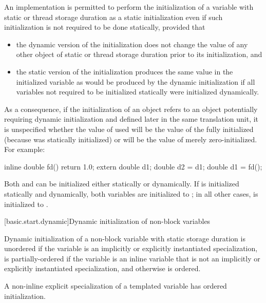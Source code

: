 \pnum
An implementation is permitted to perform the initialization of a
variable with static or thread storage duration as a static
initialization even if such initialization is not required to be done
statically, provided that
\begin{itemize}
\item
the dynamic version of the initialization does not change the
value of any other object of static or thread storage duration
prior to its initialization, and

\item
the static version of the initialization produces the same value
in the initialized variable as would be produced by the dynamic
initialization if all variables not required to be initialized statically
were initialized dynamically.
\end{itemize}
\begin{note}
As a consequence, if the initialization of an object  refers to an
object  potentially requiring dynamic initialization and defined
later in the same translation unit, it is unspecified whether the value of  used
will be the value of the fully initialized  (because  was statically
initialized) or will be the value of  merely zero-initialized. For example:
\begin{codeblock}
inline double fd() { return 1.0; }
extern double d1;
double d2 = d1;
double d1 = fd();
\end{codeblock}
Both  and  can be initialized
either statically or dynamically.
If  is initialized statically and  dynamically,
both variables are initialized to ;
in all other cases,  is initialized to .
\end{note}

[basic.start.dynamic]{Dynamic initialization of non-block variables}

\pnum
{}%
%
%
Dynamic initialization of a non-block variable with static storage duration is
unordered if the variable is an implicitly or explicitly instantiated
specialization, is partially-ordered if the variable
is an inline variable that is not an implicitly or explicitly instantiated
specialization, and otherwise is ordered.
\begin{note}
A non-inline explicit specialization of a templated variable
has ordered initialization.
\end{note}

